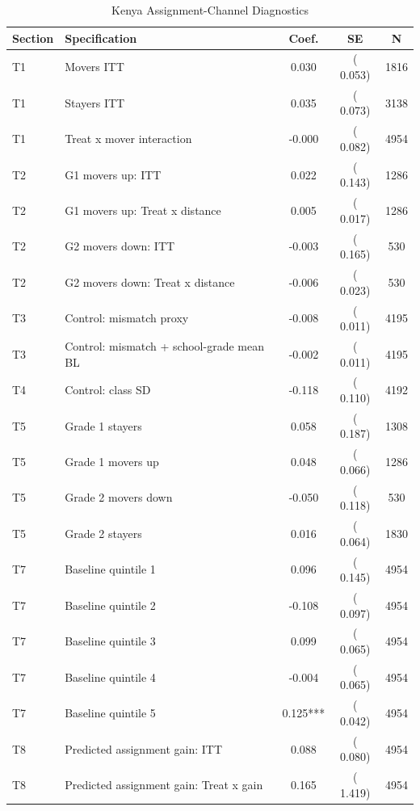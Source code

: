 \begin{table}[!htbp]
\centering
\caption{Kenya Assignment-Channel Diagnostics}
\label{tab:assignment_channel_tests_kenya}
\begin{threeparttable}
\scriptsize
\begin{tabular}[t]{llccc}
\toprule
Section & Specification & Coef. & SE & N \\
\midrule
T1 & Movers ITT &   0.030 & (  0.053) &    1816 \\
T1 & Stayers ITT &   0.035 & (  0.073) &    3138 \\
T1 & Treat x mover interaction &  -0.000 & (  0.082) &    4954 \\
\addlinespace
T2 & G1 movers up: ITT &   0.022 & (  0.143) & 1286 \\
T2 & G1 movers up: Treat x distance &   0.005 & (  0.017) & 1286 \\
T2 & G2 movers down: ITT &  -0.003 & (  0.165) & 530 \\
T2 & G2 movers down: Treat x distance &  -0.006 & (  0.023) & 530 \\
\addlinespace
T3 & Control: mismatch proxy &  -0.008 & (  0.011) & 4195 \\
T3 & Control: mismatch + school-grade mean BL &  -0.002 & (  0.011) & 4195 \\
\addlinespace
T4 & Control: class SD &  -0.118 & (  0.110) & 4192 \\
T5 & Grade 1 stayers &   0.058 & (  0.187) & 1308 \\
T5 & Grade 1 movers up &   0.048 & (  0.066) & 1286 \\
T5 & Grade 2 movers down &  -0.050 & (  0.118) & 530 \\
T5 & Grade 2 stayers &   0.016 & (  0.064) & 1830 \\
\addlinespace
T7 & Baseline quintile 1 &   0.096 & (  0.145) & 4954 \\
T7 & Baseline quintile 2 &  -0.108 & (  0.097) & 4954 \\
T7 & Baseline quintile 3 &   0.099 & (  0.065) & 4954 \\
T7 & Baseline quintile 4 &  -0.004 & (  0.065) & 4954 \\
T7 & Baseline quintile 5 &   0.125*** & (  0.042) & 4954 \\
\addlinespace
T8 & Predicted assignment gain: ITT &   0.088 & (  0.080) & 4954 \\
T8 & Predicted assignment gain: Treat x gain &   0.165 & (  1.419) & 4954 \\
\bottomrule
\end{tabular}

\end{threeparttable}
\end{table}
